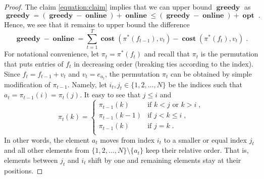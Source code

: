 \documentclass[12pt]{article}
\DeclareMathOperator{\cost}{\mathbf{cost}}
\DeclareMathOperator{\greedy}{\mathbf{greedy}}
\DeclareMathOperator{\online}{\mathbf{online}}
\DeclareMathOperator{\opt}{\mathbf{opt}}
\begin{document}
\begin{proof}
The claim \eqref{equation:claim} implies that we can upper bound $\greedy$ as
$$
\greedy
= (\greedy - \online) + \online
\le (\greedy - \online) + \opt \; .
$$
Hence, we see that it remains to upper bound the difference
$$
\greedy - \online = \sum_{t=1}^T \cost(\pi^*(f_{t-1}), v_t) - \cost(\pi^*(f_t), v_t) \; .
$$
For notational convenience, let $\pi_t = \pi^*(f_t)$ and recall that $\pi_t$ is
the permutation that puts entries of $f_t$ in decreasing order (breaking ties
according to the index). Since $f_t = f_{t-1} + v_t$ and $v_t = e_{a_t}$, the
permutation $\pi_t$ can be obtained by simple modification of $\pi_{t-1}$.
Namely, let $i_t, j_t \in \{1,2,\dots,N\}$ be the indices such that $a_t =
\pi_{t-1}(i) = \pi_t(j)$. It easy to see that $j \le i$ and
$$
\pi_t(k) =
\begin{cases}
\pi_{t-1}(k) & \text{if $k < j$ or $k > i$} \; ,  \\
\pi_{t-1}(k-1) & \text{if $j < k \le i$} \; , \\
\pi_{t-1}(k) & \text{if $j = k$} \; . \\
\end{cases}
$$
In other words, the element $a_t$ moves from index $i_t$ to a smaller or equal
index $j_t$ and all other elements from $\{1,2,\dots,N\} \setminus \{a_t\}$ keep
their relative order. That is, elements between $j_t$ and $i_t$ shift by one and
remaining elements stay at their positions.


\end{proof}
\end{document}
